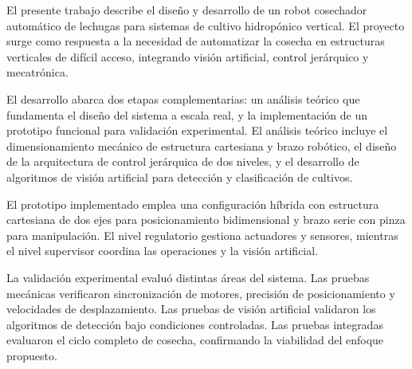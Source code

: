 El presente trabajo describe el diseño y desarrollo de un robot cosechador automático de lechugas para sistemas de cultivo hidropónico vertical. El proyecto surge como respuesta a la necesidad de automatizar la cosecha en estructuras verticales de difícil acceso, integrando visión artificial, control jerárquico y mecatrónica.

El desarrollo abarca dos etapas complementarias: un análisis teórico que fundamenta el diseño del sistema a escala real, y la implementación de un prototipo funcional para validación experimental. El análisis teórico incluye el dimensionamiento mecánico de estructura cartesiana y brazo robótico, el diseño de la arquitectura de control jerárquica de dos niveles, y el desarrollo de algoritmos de visión artificial para detección y clasificación de cultivos.

El prototipo implementado emplea una configuración híbrida con estructura cartesiana de dos ejes para posicionamiento bidimensional y brazo serie con pinza para manipulación. El nivel regulatorio gestiona actuadores y sensores, mientras el nivel supervisor coordina las operaciones y la visión artificial.

La validación experimental evaluó distintas áreas del sistema. Las pruebas mecánicas verificaron sincronización de motores, precisión de posicionamiento y velocidades de desplazamiento. Las pruebas de visión artificial validaron los algoritmos de detección bajo condiciones controladas. Las pruebas integradas evaluaron el ciclo completo de cosecha, confirmando la viabilidad del enfoque propuesto.